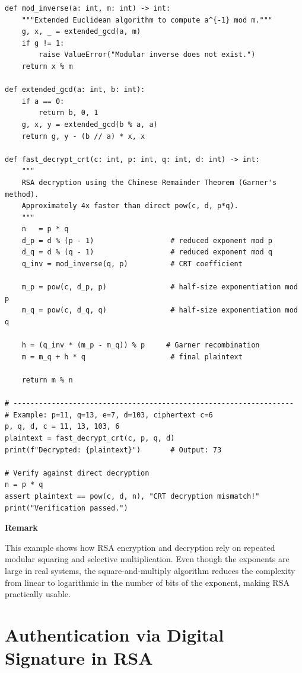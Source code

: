\lstset{style=pythonstyle}
\begin{lstlisting}
def mod_inverse(a: int, m: int) -> int:
    """Extended Euclidean algorithm to compute a^{-1} mod m."""
    g, x, _ = extended_gcd(a, m)
    if g != 1:
        raise ValueError("Modular inverse does not exist.")
    return x % m

def extended_gcd(a: int, b: int):
    if a == 0:
        return b, 0, 1
    g, x, y = extended_gcd(b % a, a)
    return g, y - (b // a) * x, x

def fast_decrypt_crt(c: int, p: int, q: int, d: int) -> int:
    """
    RSA decryption using the Chinese Remainder Theorem (Garner's method).
    Approximately 4x faster than direct pow(c, d, p*q).
    """
    n   = p * q
    d_p = d % (p - 1)                  # reduced exponent mod p
    d_q = d % (q - 1)                  # reduced exponent mod q
    q_inv = mod_inverse(q, p)          # CRT coefficient

    m_p = pow(c, d_p, p)               # half-size exponentiation mod p
    m_q = pow(c, d_q, q)               # half-size exponentiation mod q

    h = (q_inv * (m_p - m_q)) % p     # Garner recombination
    m = m_q + h * q                    # final plaintext

    return m % n

# ------------------------------------------------------------------
# Example: p=11, q=13, e=7, d=103, ciphertext c=6
p, q, d, c = 11, 13, 103, 6
plaintext = fast_decrypt_crt(c, p, q, d)
print(f"Decrypted: {plaintext}")       # Output: 73

# Verify against direct decryption
n = p * q
assert plaintext == pow(c, d, n), "CRT decryption mismatch!"
print("Verification passed.")
\end{lstlisting}

\textbf{Remark}

This example shows how RSA encryption and decryption rely on repeated modular squaring and selective multiplication. Even though the exponents are large in real systems, the square-and-multiply algorithm reduces the complexity from linear to logarithmic in the number of bits of the exponent, making RSA practically usable.


\section{Authentication via Digital Signature in RSA}

